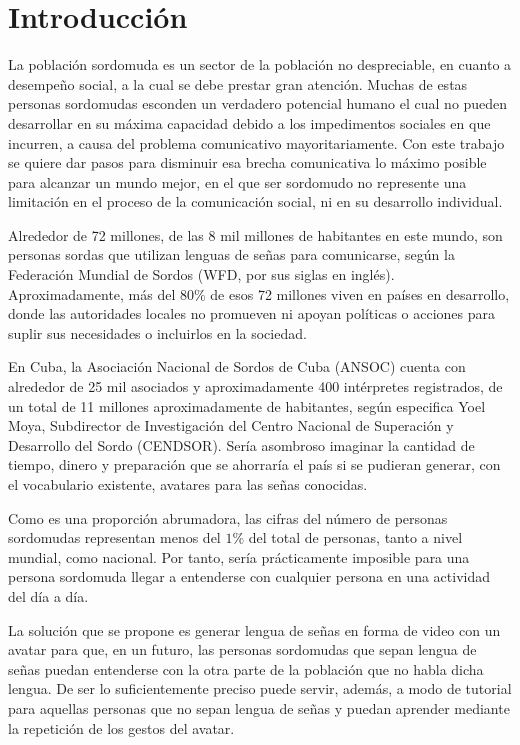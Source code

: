 \chapter*{Introducción}\label{chapter:introduction}

La población sordomuda es un sector de la población no despreciable, en cuanto a desempeño social, a la cual se debe prestar gran atención. Muchas de estas personas sordomudas esconden un verdadero potencial humano el cual no pueden desarrollar en su máxima capacidad debido a los impedimentos sociales en que incurren, a causa del problema comunicativo mayoritariamente. Con este trabajo se quiere dar pasos para disminuir esa brecha comunicativa lo máximo posible para alcanzar un mundo mejor, en el que ser sordomudo no represente una limitación en el proceso de la comunicación social, ni en su desarrollo individual.

Alrededor de 72 millones, de las 8 mil millones de habitantes en este mundo, son personas sordas que utilizan lenguas de señas para comunicarse, según la Federación Mundial de Sordos (WFD, por sus siglas en inglés). Aproximadamente, más del $80 \%$ de esos 72 millones viven en países en desarrollo, donde las autoridades locales no promueven ni apoyan políticas o acciones para suplir sus necesidades o incluirlos en la sociedad.

En Cuba, la Asociación Nacional de Sordos de Cuba (ANSOC) cuenta con alrededor de 25 mil asociados y aproximadamente 400 intérpretes registrados, de un total de 11 millones aproximadamente de habitantes, según especifica Yoel Moya, Subdirector de Investigación del Centro Nacional de Superación y Desarrollo del Sordo (CENDSOR). Sería asombroso imaginar la cantidad de tiempo, dinero y preparación que se ahorraría el país si se pudieran generar, con el vocabulario existente, avatares para las señas conocidas.

Como es una proporción abrumadora, las cifras del número de personas sordomudas representan menos del $1 \%$ del total de personas, tanto a nivel mundial, como nacional. Por tanto, sería prácticamente imposible para una persona sordomuda llegar a entenderse con cualquier persona en una actividad del día a día.

 La solución que se propone es generar lengua de señas en forma de video con un avatar para que, en un futuro, las personas sordomudas que sepan lengua de señas puedan entenderse con la otra parte de la población que no habla dicha lengua. De ser lo suficientemente preciso puede servir, además, a modo de tutorial para aquellas personas que no sepan lengua de señas y puedan aprender mediante la repetición de los gestos del avatar.
 
